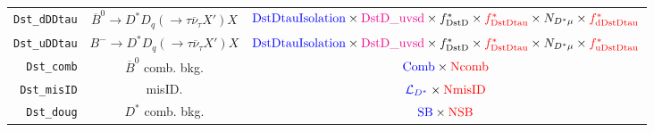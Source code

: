 \begin{landscape}
\begin{table}
\begin{tabular}{r|c|c}
  \texttt{Dst\_dDDtau} & $\overline{B}^0 \rightarrow D^* D_q (\rightarrow \tau \overline{\nu}_\tau X') X$  &                                                                                        $\textcolor{blue}{\text{DstDtauIsolation}} \times \textcolor{magenta}{\text{DstD\_uvsd}} \times f^{*}_\text{DstD} \times \textcolor{red}{f^{*}_\text{DstDtau}} \times N_{D^* \mu} \times \textcolor{red}{f^{*}_\text{dDstDtau}}$                                                                                         \\
  \texttt{Dst\_uDDtau} &       $B^- \rightarrow D^* D_q (\rightarrow \tau \overline{\nu}_\tau X') X$       &                                                                                        $\textcolor{blue}{\text{DstDtauIsolation}} \times \textcolor{magenta}{\text{DstD\_uvsd}} \times f^{*}_\text{DstD} \times \textcolor{red}{f^{*}_\text{DstDtau}} \times N_{D^* \mu} \times \textcolor{red}{f^{*}_\text{uDstDtau}}$                                                                                         \\
    \texttt{Dst\_comb} &                            $\overline{B}^0$ comb. bkg.                            &                                                                                                                                                                      $\textcolor{blue}{\text{Comb}} \times \textcolor{red}{\text{Ncomb}}$                                                                                                                                                                       \\
   \texttt{Dst\_misID} &                                      misID.                                       &                                                                                                                                                                   $\textcolor{blue}{\mathcal{L}_{D^*}} \times \textcolor{red}{\text{NmisID}}$                                                                                                                                                                   \\
    \texttt{Dst\_doug} &                                 $D^*$ comb. bkg.                                  &                                                                                                                                                                        $\textcolor{blue}{\text{SB}} \times \textcolor{red}{\text{NSB}}$                                                                                                                                                                         \\
\bottomrule
\end{tabular}

\end{table}
\end{landscape}
